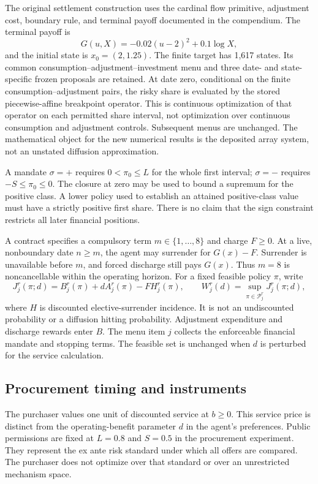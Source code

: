 The original settlement construction uses the cardinal flow primitive, adjustment cost, boundary rule, and terminal payoff documented in the compendium. The terminal payoff is
\begin{equation}
 G(u,X)=-0.02(u-2)^2+0.1\log X,
\end{equation}
and the initial state is $x_0=(2,1.25)$. The finite target has 1,617 states. Its common consumption--adjustment--investment menu and three date- and state-specific frozen proposals are retained. At date zero, conditional on the finite consumption--adjustment pairs, the risky share is evaluated by the stored piecewise-affine breakpoint operator. This is continuous optimization of that operator on each permitted share interval, not optimization over continuous consumption and adjustment controls. Subsequent menus are unchanged. The mathematical object for the new numerical results is the deposited array system, not an unstated diffusion approximation.

A mandate $\sigma=+$ requires $0<\pi_0\leq L$ for the whole first interval; $\sigma=-$ requires $-S\leq\pi_0\leq0$. The closure at zero may be used to bound a supremum for the positive class. A lower policy used to establish an attained positive-class value must have a strictly positive first share. There is no claim that the sign constraint restricts all later financial positions.

A contract specifies a compulsory term $m\in\{1,\ldots,8\}$ and charge $F\geq0$. At a live, nonboundary date $n\geq m$, the agent may surrender for $G(x)-F$. Surrender is unavailable before $m$, and forced discharge still pays $G(x)$. Thus $m=8$ is noncancellable within the operating horizon. For a fixed feasible policy $\pi$, write
\begin{equation}
 J^r_j(\pi;d)=B^r_j(\pi)+dA^r_j(\pi)-F H^r_j(\pi),\qquad
 W^r_j(d)=\sup_{\pi\in\mathcal P^r_j}J^r_j(\pi;d),
 \label{eq:r12_policy}
\end{equation}
where $H$ is discounted elective-surrender incidence. It is not an undiscounted probability or a diffusion hitting probability. Adjustment expenditure and discharge rewards enter $B$. The menu item $j$ collects the enforceable financial mandate and stopping terms. The feasible set is unchanged when $d$ is perturbed for the service calculation.

\subsection{Procurement timing and instruments}
The purchaser values one unit of discounted service at $b\geq0$. This service price is distinct from the operating-benefit parameter $d$ in the agent's preferences. Public permissions are fixed at $L=0.8$ and $S=0.5$ in the procurement experiment. They represent the ex ante risk standard under which all offers are compared. The purchaser does not optimize over that standard or over an unrestricted mechanism space.

